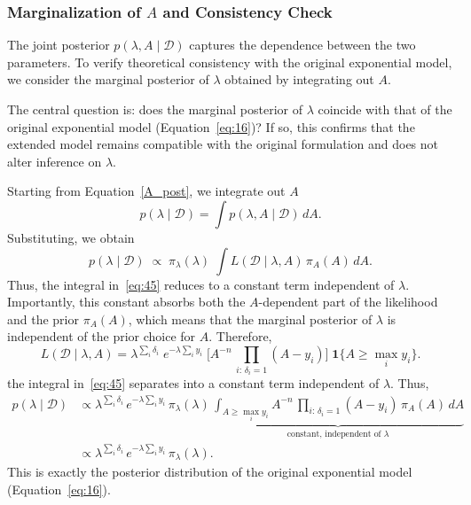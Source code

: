 \subsubsection{Marginalization of \texorpdfstring{$A$}{A} and Consistency Check}
\label{边际化章节}
The joint posterior $p(\lambda, A \mid \mathcal D)$ captures the dependence between the two parameters. To verify theoretical consistency with the original exponential model, we consider the marginal posterior of $\lambda$ obtained by integrating out $A$.   

The central question is: does the marginal posterior of $\lambda$ coincide with that of the original exponential model (Equation~\ref{eq:16})? If so, this confirms that the extended model remains compatible with the original formulation and does not alter inference on $\lambda$.

Starting from Equation~\eqref{A_post}, we integrate out $A$
\begin{equation}
    p(\lambda \mid \mathcal D)
= \int p(\lambda, A \mid \mathcal D)\,dA.
\end{equation}
Substituting, we obtain
\begin{equation}
    p(\lambda \mid \mathcal D)\;\propto\;\pi_\lambda(\lambda)\;\int L(\mathcal D \mid \lambda, A)\,\pi_A(A)\,dA.
    \label{eq:45}
\end{equation}
Thus, the integral in~\eqref{eq:45} reduces to a constant term independent of $\lambda$. 
Importantly, this constant absorbs both the $A$-dependent part of the likelihood and the prior $\pi_A(A)$, which means that the marginal posterior of $\lambda$ is independent of the prior choice for $A$. 
Therefore,
\begin{equation}
    L(\mathcal D \mid \lambda, A)
= \lambda^{\sum_i \delta_i}\;
e^{-\lambda \sum_i y_i}\;
\Bigg[
A^{-n}\,\prod_{i:\,\delta_i=1}(A-y_i)
\Bigg]\;\mathbf 1\{A \ge \max_i y_i\}.
\end{equation}
the integral in~\eqref{eq:45} separates into a constant term independent of $\lambda$. Thus,
\begin{align}
p(\lambda \mid \mathcal{D})
&\propto \lambda^{\sum_i \delta_i}\,
e^{-\lambda \sum_i y_i}\,
\pi_\lambda(\lambda)\,
\underbrace{\int_{A \ge \max_i y_i}
A^{-n}\,\prod_{i:\,\delta_i=1}(A-y_i)\,\pi_A(A)\,dA}_{\text{constant, independent of }\lambda} \\[2pt]
&\propto \lambda^{\sum_i \delta_i}\, e^{-\lambda \sum_i y_i}\, \pi_{\lambda}(\lambda).
\end{align}
This is exactly the posterior distribution of the original exponential model (Equation~\ref{eq:16}).  

